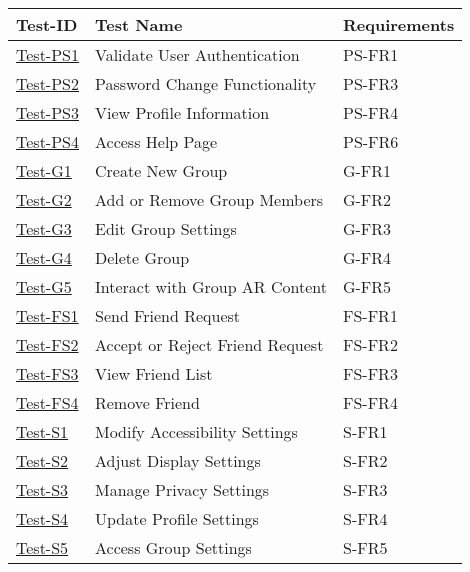\documentclass[12pt, titlepage]{article}
\begin{document}
\begin{table}[h!]
    \centering
    \begin{tabular}{|l|l|l|}
        \hline
        \textbf{Test-ID} & \textbf{Test Name} & \textbf{Requirements} \\
        \hline
        \hyperref[itm:Test-PS1]{Test-PS1} & Validate User Authentication & PS-FR1 \\
        \hline
        \hyperref[itm:Test-PS2]{Test-PS2} & Password Change Functionality & PS-FR3 \\
        \hline
        \hyperref[itm:Test-PS3]{Test-PS3} & View Profile Information & PS-FR4 \\
        \hline
        \hyperref[itm:Test-PS4]{Test-PS4} & Access Help Page & PS-FR6 \\
        \hline
        \hyperref[itm:Test-G1]{Test-G1} & Create New Group & G-FR1 \\
        \hline
        \hyperref[itm:Test-G2]{Test-G2} & Add or Remove Group Members & G-FR2 \\
        \hline
        \hyperref[itm:Test-G3]{Test-G3} & Edit Group Settings & G-FR3 \\
        \hline
        \hyperref[itm:Test-G4]{Test-G4} & Delete Group & G-FR4 \\
        \hline
        \hyperref[itm:Test-G5]{Test-G5} & Interact with Group AR Content & G-FR5 \\
        \hline
        \hyperref[itm:Test-FS1]{Test-FS1} & Send Friend Request & FS-FR1 \\
        \hline
        \hyperref[itm:Test-FS2]{Test-FS2} & Accept or Reject Friend Request & FS-FR2 \\
        \hline
        \hyperref[itm:Test-FS3]{Test-FS3} & View Friend List & FS-FR3 \\
        \hline
        \hyperref[itm:Test-FS4]{Test-FS4} & Remove Friend & FS-FR4 \\
        \hline
        \hyperref[itm:Test-S1]{Test-S1} & Modify Accessibility Settings & S-FR1 \\
        \hline
        \hyperref[itm:Test-S2]{Test-S2} & Adjust Display Settings & S-FR2 \\
        \hline
        \hyperref[itm:Test-S3]{Test-S3} & Manage Privacy Settings & S-FR3 \\
        \hline
        \hyperref[itm:Test-S4]{Test-S4} & Update Profile Settings & S-FR4 \\
        \hline
        \hyperref[itm:Test-S5]{Test-S5} & Access Group Settings & S-FR5 \\

\end{tabular}
\end{table}
\end{document}
